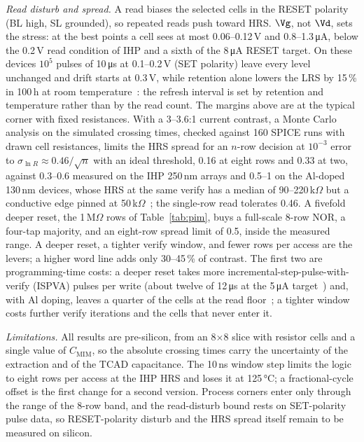 \textit{Read disturb and spread.} A read biases the selected cells in the RESET polarity (BL
high, SL grounded), so repeated reads push toward HRS. $\Vg$, not $\Vd$, sets the stress: at the best points a cell sees at most 0.06--0.12\,V and 0.8--1.3\,\si{\micro\ampere}, below
the 0.2\,V read condition of IHP and a sixth of the 8\,\si{\micro\ampere} RESET target. On these
devices $10^5$ pulses of 10\,\si{\micro\second} at 0.1--0.2\,V (SET polarity) leave every
level unchanged and drift starts at 0.3\,V, while retention alone lowers the LRS by 15\,\% in
100\,h at room temperature~\cite{baroni2026drift}:
the refresh interval is set by retention and temperature rather than by the read
count.
The margins above are at the typical corner with fixed resistances. With a 3--3.6:1
current contrast, a Monte Carlo analysis on the simulated crossing times, checked against 160 SPICE
runs with drawn cell resistances, limits the HRS spread for an
$n$-row decision at $10^{-3}$ error to $\sigma_{\ln R}\approx0.46/\sqrt{n}$ with an ideal
threshold, 0.16 at eight rows and 0.33 at two, against 0.3--0.6 measured on the IHP 250\,nm arrays and 0.5--1 on the
Al-doped 130\,nm devices, whose HRS at the same verify has a median of 90--220\,k$\Omega$ but a
conductive edge pinned at 50\,k$\Omega$~\cite{perez2017hfalo,baroni2025aldoping}; the single-row read tolerates 0.46. A fivefold deeper reset, the 1\,M$\Omega$ rows of
Table~\ref{tab:pim}, buys a full-scale 8-row NOR, a four-tap majority, and an eight-row spread
limit of 0.5, inside the measured range. A deeper reset, a tighter verify window, and fewer rows per access are the levers; a higher
word line adds only 30--45\,\% of contrast. The first two are programming-time costs: a deeper reset takes
more incremental-step-pulse-with-verify (ISPVA) pulses per write (about twelve of 12\,\si{\micro\second} at the 5\,\si{\micro\ampere}
target~\cite{perez2017hfalo}) and, with Al doping, leaves a quarter of the cells at the read
floor~\cite{baroni2025aldoping}; a tighter window costs further verify iterations and the
cells that never enter it.

\textit{Limitations.} All results are pre-silicon, from an 8$\times$8 slice with resistor cells
and a single value of $C_\mathrm{MIM}$, so the absolute crossing times carry the uncertainty of
the extraction and of the TCAD capacitance. The 10\,ns window step limits the logic to eight
rows per access at the IHP HRS and loses it at 125\,\si{\celsius}; a fractional-cycle offset is
the first change for a second version. Process corners enter only through the range of the
8-row band, and the read-disturb bound rests on SET-polarity pulse data, so RESET-polarity
disturb and the HRS spread itself remain to be measured on silicon.
